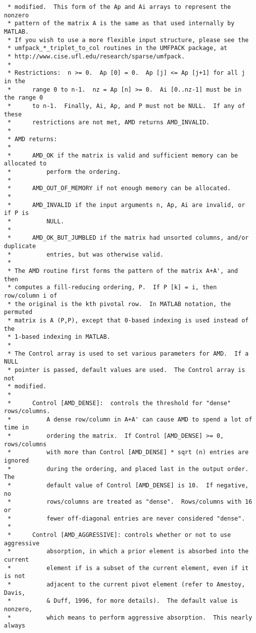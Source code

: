 \documentclass[11pt]{article}
\begin{document}
{\begin{verbatim}
 * modified.  This form of the Ap and Ai arrays to represent the nonzero
 * pattern of the matrix A is the same as that used internally by MATLAB.
 * If you wish to use a more flexible input structure, please see the
 * umfpack_*_triplet_to_col routines in the UMFPACK package, at
 * http://www.cise.ufl.edu/research/sparse/umfpack.
 *
 * Restrictions:  n >= 0.  Ap [0] = 0.  Ap [j] <= Ap [j+1] for all j in the
 *      range 0 to n-1.  nz = Ap [n] >= 0.  Ai [0..nz-1] must be in the range 0
 *      to n-1.  Finally, Ai, Ap, and P must not be NULL.  If any of these
 *      restrictions are not met, AMD returns AMD_INVALID.
 *
 * AMD returns:
 *
 *      AMD_OK if the matrix is valid and sufficient memory can be allocated to
 *          perform the ordering.
 *
 *      AMD_OUT_OF_MEMORY if not enough memory can be allocated.
 *
 *      AMD_INVALID if the input arguments n, Ap, Ai are invalid, or if P is
 *          NULL.
 *
 *      AMD_OK_BUT_JUMBLED if the matrix had unsorted columns, and/or duplicate
 *          entries, but was otherwise valid.
 *
 * The AMD routine first forms the pattern of the matrix A+A', and then
 * computes a fill-reducing ordering, P.  If P [k] = i, then row/column i of
 * the original is the kth pivotal row.  In MATLAB notation, the permuted
 * matrix is A (P,P), except that 0-based indexing is used instead of the
 * 1-based indexing in MATLAB.
 *
 * The Control array is used to set various parameters for AMD.  If a NULL
 * pointer is passed, default values are used.  The Control array is not
 * modified.
 *
 *      Control [AMD_DENSE]:  controls the threshold for "dense" rows/columns.
 *          A dense row/column in A+A' can cause AMD to spend a lot of time in
 *          ordering the matrix.  If Control [AMD_DENSE] >= 0, rows/columns
 *          with more than Control [AMD_DENSE] * sqrt (n) entries are ignored
 *          during the ordering, and placed last in the output order.  The
 *          default value of Control [AMD_DENSE] is 10.  If negative, no
 *          rows/columns are treated as "dense".  Rows/columns with 16 or
 *          fewer off-diagonal entries are never considered "dense".
 *
 *      Control [AMD_AGGRESSIVE]: controls whether or not to use aggressive
 *          absorption, in which a prior element is absorbed into the current
 *          element if is a subset of the current element, even if it is not
 *          adjacent to the current pivot element (refer to Amestoy, Davis,
 *          & Duff, 1996, for more details).  The default value is nonzero,
 *          which means to perform aggressive absorption.  This nearly always

\end{verbatim}}
\end{document}
